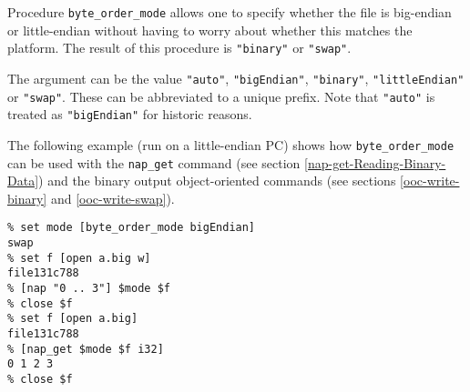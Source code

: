 Procedure \texttt{byte\_order\_mode} allows one to specify whether 
the file is big-endian or little-endian without having to worry about whether
this matches the platform.
The result of this procedure is \texttt{"binary"} or \texttt{"swap"}.

The argument can be the value \texttt{"auto"}, \texttt{"bigEndian"}, \texttt{"binary"},
\texttt{"littleEndian"} or \texttt{"swap"}.
These can be abbreviated to a unique prefix.
Note that \texttt{"auto"} is treated as \texttt{"bigEndian"} for historic reasons.

The following example (run on a little-endian PC) shows how \texttt{byte\_order\_mode} 
can be used with
the \texttt{nap\_get} command (see section \ref{nap-get-Reading-Binary-Data})
and the binary output object-oriented commands (see sections \ref{ooc-write-binary}
and \ref{ooc-write-swap}).
  \begin{verbatim}
% set mode [byte_order_mode bigEndian]
swap
% set f [open a.big w]
file131c788
% [nap "0 .. 3"] $mode $f
% close $f
% set f [open a.big]
file131c788
% [nap_get $mode $f i32]
0 1 2 3
% close $f
\end{verbatim}
